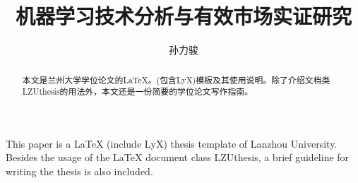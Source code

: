 \documentclass[twoside,longtitle]{LZUthesis}
\begin{document}
\classification{}

\confidential{}

\title{机器学习技术分析与有效市场实证研究}




\author{孙力骏}






\submitdate{}


\degreedate{}


\maketitle

\makestatement

\frontmatter{}

\begin{abstract}
本文是兰州大学学位论文的\LaTeX{}。(包含LyX)模板及其使用说明。除了介绍文档类LZUthesis的用法外，本文还是一份简要的学位论文写作指南。
\end{abstract}


\begin{englishabstract}
This paper is a \LaTeX{} (include LyX) thesis template of Lanzhou University. Besides the usage of the LaTeX document class LZUthesis, a brief guideline for writing the thesis is also included.
\end{englishabstract}

\end{document}
